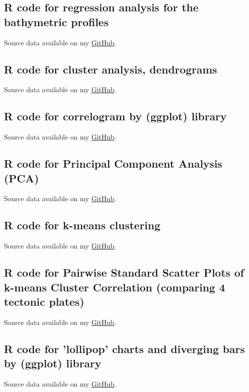 \documentclass[11pt,a4paper]{report}
\begin{document}
{\begin{appendices}
\subsection{R code for regression analysis for the bathymetric profiles}\label{R:05}
Source data available on my \href{https://github.com/paulinelemenkova/R-4-Regression-Analysis}{GitHub}.


\subsection{R code for cluster analysis, dendrograms}\label{R:06}
Source data available on my \href{https://github.com/paulinelemenkova/R-5-Cluster-Analysis-Dendrogramms-}{GitHub}.



\subsection{R code for correlogram by (ggplot) library}\label{R:07}
Source data available on my \href{https://github.com/paulinelemenkova/R-6-Correlogram}{GitHub}.


\subsection{R code for Principal Component Analysis (PCA)}\label{R:08}
Source data available on my \href{https://github.com/paulinelemenkova/R-7-Principal-Component-Analysis-PCA-}{GitHub}.

\pagebreak

\subsection{R code for k-means clustering}\label{R:09}
Source data available on my \href{https://github.com/paulinelemenkova/R-8-k-means-Cluster-Analysis}{GitHub}.


\subsection{R code for Pairwise Standard Scatter Plots of k-means Cluster Correlation (comparing 4 tectonic plates)}\label{R:10}
Source data available on my \href{https://github.com/paulinelemenkova/R-8-k-means-Cluster-Analysis}{GitHub}.

\pagebreak

\subsection{R code for 'lollipop' charts and diverging bars by (ggplot) library}\label{R:11}
Source data available on my \href{https://github.com/paulinelemenkova/R-9-10.-Lollipop-Charts-and-Diverging-Bars}{GitHub}.

\pagebreak


\end{appendices}}
\end{document}
